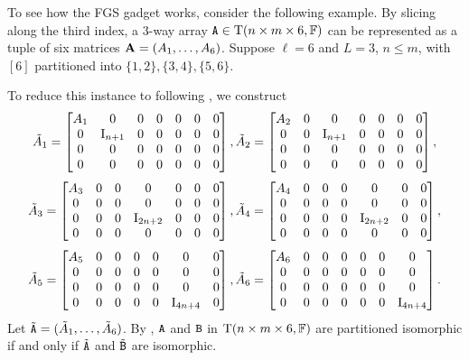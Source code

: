 \begin{example}\label{ex:FGS}
To see how the FGS gadget works, consider the following example. By slicing along the third index, a $3$-way array $\mathtt{A}\in\mathrm{T}(n\times m\times 6, \mathbb{F})$ can be represented as a tuple of six matrices $\mathbf{A}=(A_1, \dots, A_6)$. Suppose $\ell=6$ and $L=3$, $n\leq m$, with $[6]$ partitioned into $\{1, 2\}, \{3, 4\}, \{5, 6\}$. 

To reduce this \pTI instance to \TI following \cite{FGS19}, we construct 
\[\tilde A_1=\begin{bmatrix}
	A_1 & 0 & 0 & 0 & 0 & 0 & 0 \\
	0 & \mathrm{I}_{n+1} & 0 & 0 & 0 & 0 & 0 \\
	0 & 0 & 0 & 0 & 0 & 0 & 0 \\
	0 & 0 & 0 & 0 & 0 & 0 & 0 \\
\end{bmatrix}, 
\tilde A_2=\begin{bmatrix}
	A_ 2& 0 & 0 & 0 & 0 & 0 & 0 \\
	0 & 0 & \mathrm{I}_{n+1} & 0 & 0 & 0 & 0 \\
	0 & 0 & 0 & 0 & 0 & 0 & 0 \\
	0 & 0 & 0 & 0 & 0 & 0 & 0 \\
\end{bmatrix},\]
\[
\tilde A_3=\begin{bmatrix}
	A_3 & 0 & 0 & 0 & 0 & 0 & 0 \\
	0 & 0 & 0 & 0 & 0 & 0 & 0 \\
	0 & 0 & 0 & \mathrm{I}_{2n+2} & 0 & 0 & 0 \\
	0 & 0 & 0 & 0 & 0 & 0 & 0 \\
\end{bmatrix},
\tilde A_4=\begin{bmatrix}
	A_4 & 0 & 0 & 0 & 0 & 0 & 0 \\
	0 & 0 & 0 & 0 & 0 & 0 & 0 \\
	0 & 0 & 0 & 0 & \mathrm{I}_{2n+2} & 0 & 0 \\
	0 & 0 & 0 & 0 & 0 & 0 & 0 \\
\end{bmatrix}, \]
\[
\tilde A_5=\begin{bmatrix}
	A_5 & 0 & 0 & 0 & 0 & 0 & 0 \\
	0 & 0 & 0 & 0 & 0 & 0 & 0 \\
	0 & 0 & 0 & 0 & 0 & 0 & 0 \\
	0 & 0 & 0 & 0 & 0 & \mathrm{I}_{4n+4} & 0 \\
\end{bmatrix}, 
\tilde A_6=\begin{bmatrix}
	A_6 & 0 & 0 & 0 & 0 & 0 & 0 \\
	0 & 0 & 0 & 0 & 0 & 0 & 0 \\
	0 & 0 & 0 & 0 & 0 & 0 & 0 \\
	0 & 0 & 0 & 0 & 0 & 0 & \mathrm{I}_{4n+4} \\
\end{bmatrix}.
\]
Let $\tilde{\mathtt{A}}=(\tilde A_1, \dots, \tilde A_6)$. By \cite[Lemma 2.2]{FGS19}, $\mathtt{A}$ and $\mathtt{B}$ in $\mathrm{T}(n\times m\times 6, \mathbb{F})$ are partitioned isomorphic if and only if $\tilde{\mathtt{A}}$ and $\tilde{\mathtt{B}}$ are isomorphic. 


\end{example}
